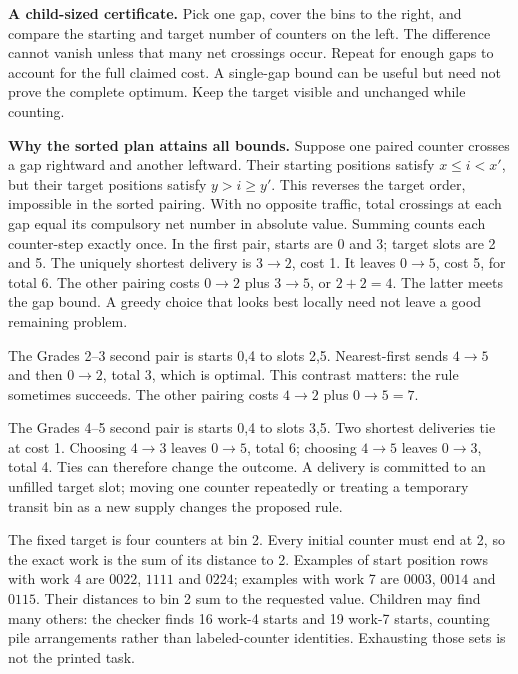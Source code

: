 \textbf{A child-sized certificate.} Pick one gap, cover the bins to the right, and compare the starting and target number of counters on the left. The difference cannot vanish unless that many net crossings occur. Repeat for enough gaps to account for the full claimed cost. A single-gap bound can be useful but need not prove the complete optimum. Keep the target visible and unchanged while counting.

\textbf{Why the sorted plan attains all bounds.} Suppose one paired counter crosses a gap rightward and another leftward. Their starting positions satisfy $x\le i<x'$, but their target positions satisfy $y>i\ge y'$. This reverses the target order, impossible in the sorted pairing. With no opposite traffic, total crossings at each gap equal its compulsory net number in absolute value. Summing counts each counter-step exactly once.
\newpage
{}
In the first pair, starts are 0 and 3; target slots are 2 and 5. The uniquely shortest delivery is $3\to2$, cost 1. It leaves $0\to5$, cost 5, for total 6. The other pairing costs $0\to2$ plus $3\to5$, or $2+2=4$. The latter meets the gap bound. A greedy choice that looks best locally need not leave a good remaining problem.

The Grades 2--3 second pair is starts 0,4 to slots 2,5. Nearest-first sends $4\to5$ and then $0\to2$, total 3, which is optimal. This contrast matters: the rule sometimes succeeds. The other pairing costs $4\to2$ plus $0\to5=7$.

The Grades 4--5 second pair is starts 0,4 to slots 3,5. Two shortest deliveries tie at cost 1. Choosing $4\to3$ leaves $0\to5$, total 6; choosing $4\to5$ leaves $0\to3$, total 4. Ties can therefore change the outcome. A delivery is committed to an unfilled target slot; moving one counter repeatedly or treating a temporary transit bin as a new supply changes the proposed rule.

The fixed target is four counters at bin 2. Every initial counter must end at 2, so the exact work is the sum of its distance to 2. Examples of start position rows with work 4 are $0022$, $1111$ and $0224$; examples with work 7 are $0003$, $0014$ and $0115$. Their distances to bin 2 sum to the requested value. Children may find many others: the checker finds 16 work-4 starts and 19 work-7 starts, counting pile arrangements rather than labeled-counter identities. Exhausting those sets is not the printed task.

